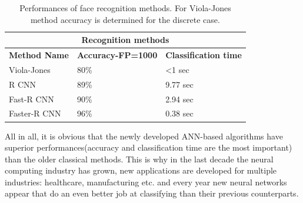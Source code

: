 \documentclass[12pt,a4paper,twoside]{report}
\begin{document}
\begin{table}[h!]
\centering
\begin{tabular}{ |p{3cm}||p{3cm}|p{3cm}| }
 \hline
 \multicolumn{3}{|c|}{\textbf{Recognition methods}} \\
 \hline
 \textbf{Method Name} & \textbf{Accuracy-FP=1000} & \textbf{Classification time} \\
 \hline
 Viola-Jones & 80\% & <1 sec\\
 \hline
 R CNN & 89\% & 9.77 sec\\
 \hline
 Fast-R CNN & 90\% & 2.94 sec\\
 \hline
 Faster-R CNN & 96\% & 0.38 sec\\
 \hline
\end{tabular}
\caption{Performances of face recognition methods. For Viola-Jones method accuracy is determined for the discrete case.}
\end{table}
\par

All in all, it is obvious that the newly developed ANN-based algorithms have superior performances(accuracy and classification time are the most important) than the older classical methods. This is why in the last decade the neural computing industry has grown, new applications are developed for multiple industries: healthcare, manufacturing etc. and every year new neural networks appear that do an even better job at classifying than their previous counterparts. 
\end{document}
